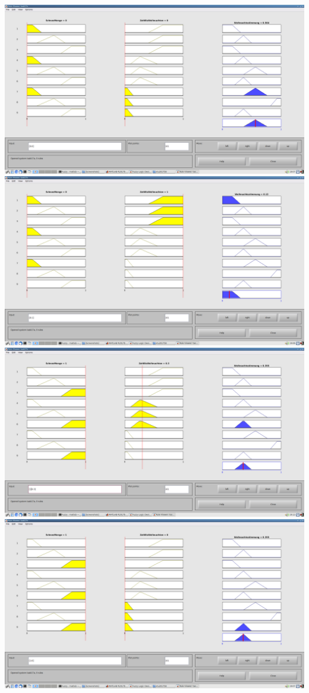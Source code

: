 \includegraphics[width=\textwidth]{part/screenshots/fuzzy-17b-0-0}
\includegraphics[width=\textwidth]{part/screenshots/fuzzy-17b-0-1}
\includegraphics[width=\textwidth]{part/screenshots/fuzzy-17b-1-0,3}
\includegraphics[width=\textwidth]{part/screenshots/fuzzy-17b-1-0}
